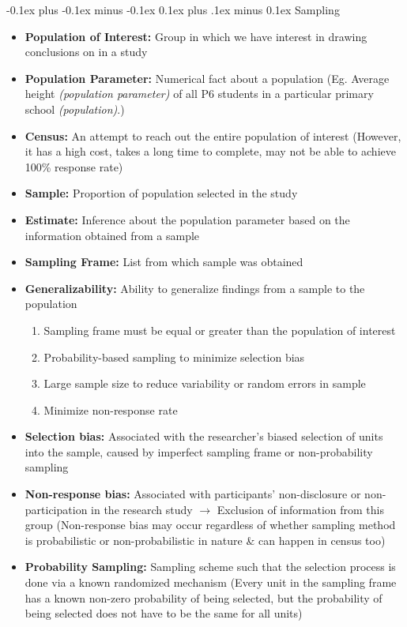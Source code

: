 \documentclass[landscape]{article}
\makeatletter
\renewcommand{\subsection}{\@startsection{subsection}{2}{0mm}%
  {-0.1ex plus -0.1ex minus -0.1ex}%
  {0.1ex plus .1ex minus 0.1ex}%
{\normalfont\scriptsize\bfseries}}
\makeatother
\begin{document}
\begin{multicols*}{5}
    \subsection{Sampling}
      \begin{itemize}
        \item \textbf{Population of Interest:} Group in which we have interest in drawing conclusions on in a study
        \item \textbf{Population Parameter:} Numerical fact about a population (Eg. Average height \textit{(population parameter)} of all P6 students in a particular primary school \textit{(population)}.)
        \item \textbf{Census:} An attempt to reach out the entire population of interest (However, it has a high cost, takes a long time to complete, may not be able to achieve 100\% response rate)
        \item \textbf{Sample:} Proportion of population selected in the study
        \item \textbf{Estimate:} Inference about the population parameter based on the information obtained from a sample
        \item \textbf{Sampling Frame:} List from which sample was obtained
        \item \textbf{Generalizability:} Ability to generalize findings from a sample to the population
        \begin{enumerate}
          \item Sampling frame must be equal or greater than the population of interest
          \item Probability-based sampling to minimize selection bias
          \item Large sample size to reduce variability or random errors in sample
          \item Minimize non-response rate
        \end{enumerate}
        \item \textbf{Selection bias:} Associated with the researcher's biased selection of units into the sample, caused by imperfect sampling frame or non-probability sampling
        \item \textbf{Non-response bias:} Associated with participants' non-disclosure or non-participation in the research study $\rightarrow$ Exclusion of information from this group (Non-response bias may occur regardless of whether sampling method is probabilistic or non-probabilistic in nature \& can happen in census too)
        \item \textbf{Probability Sampling:} Sampling scheme such that the selection process is done via a known randomized mechanism (Every unit in the sampling frame has a known non-zero probability of being selected, but the probability of being selected does not have to be the same for all units)

\end{itemize}
\end{multicols*}
\end{document}
